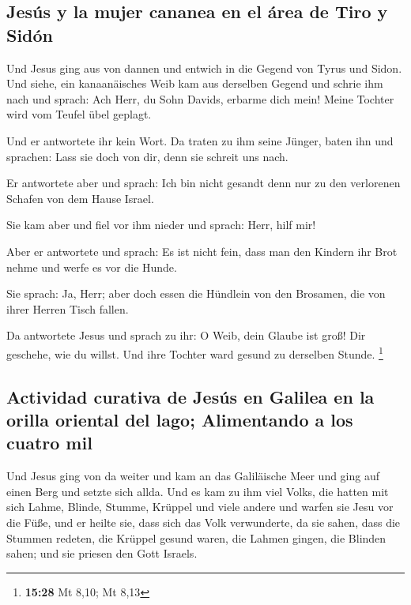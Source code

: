 \hypertarget{jesuxfas-y-la-mujer-cananea-en-el-uxe1rea-de-tiro-y-siduxf3n}{%
\subsection{Jesús y la mujer cananea en el área de Tiro y
Sidón}\label{jesuxfas-y-la-mujer-cananea-en-el-uxe1rea-de-tiro-y-siduxf3n}}

 Und Jesus ging aus von dannen und entwich in die Gegend
von Tyrus und Sidon.  Und siehe, ein kanaanäisches Weib
kam aus derselben Gegend und schrie ihm nach und sprach: Ach Herr, du
Sohn Davids, erbarme dich mein! Meine Tochter wird vom Teufel übel
geplagt.

 Und er antwortete ihr kein Wort. Da traten zu ihm seine
Jünger, baten ihn und sprachen: Lass sie doch von dir, denn sie schreit
uns nach.

 Er antwortete aber und sprach: Ich bin nicht gesandt
denn nur zu den verlorenen Schafen von dem Hause Israel.

 Sie kam aber und fiel vor ihm nieder und sprach: Herr,
hilf mir!

 Aber er antwortete und sprach: Es ist nicht fein, dass
man den Kindern ihr Brot nehme und werfe es vor die Hunde.

 Sie sprach: Ja, Herr; aber doch essen die Hündlein von
den Brosamen, die von ihrer Herren Tisch fallen.

 Da antwortete Jesus und sprach zu ihr: O Weib, dein
Glaube ist groß! Dir geschehe, wie du willst. Und ihre Tochter ward
gesund zu derselben Stunde. \footnote{\textbf{15:28} Mt 8,10; Mt 8,13}

\hypertarget{actividad-curativa-de-jesuxfas-en-galilea-en-la-orilla-oriental-del-lago-alimentando-a-los-cuatro-mil}{%
\subsection{Actividad curativa de Jesús en Galilea en la orilla oriental
del lago; Alimentando a los cuatro
mil}\label{actividad-curativa-de-jesuxfas-en-galilea-en-la-orilla-oriental-del-lago-alimentando-a-los-cuatro-mil}}

 Und Jesus ging von da weiter und kam an das Galiläische
Meer und ging auf einen Berg und setzte sich allda.  Und
es kam zu ihm viel Volks, die hatten mit sich Lahme, Blinde, Stumme,
Krüppel und viele andere und warfen sie Jesu vor die Füße, und er heilte
sie,  dass sich das Volk verwunderte, da sie sahen, dass
die Stummen redeten, die Krüppel gesund waren, die Lahmen gingen, die
Blinden sahen; und sie priesen den Gott Israels.

